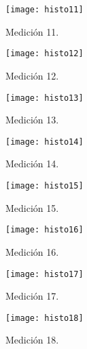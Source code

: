 \documentclass[12pt]{article}
\begin{document}
\begin{figure}[H]
\hfill
\begin{minipage}[t]{.45\textwidth}
  \centering
        \texttt{[image: histo11]}
		\caption{\footnotesize Medición 11.}
\label{fig:histo11}
\end{minipage}
\hfill
\begin{minipage}[t]{.45\textwidth}
  \centering
        \texttt{[image: histo12]}
		\caption{\footnotesize Medición 12.}
\label{fig:histo12}
\end{minipage}
\end{figure}

\begin{figure}[H]
\hfill
\begin{minipage}[t]{.45\textwidth}
  \centering
        \texttt{[image: histo13]}
		\caption{\footnotesize Medición 13.}
\label{fig:histo13}
\end{minipage}
\hfill
\begin{minipage}[t]{.45\textwidth}
  \centering
        \texttt{[image: histo14]}
		\caption{\footnotesize Medición 14.}
\label{fig:histo14}
\end{minipage}
\end{figure}

\begin{figure}[H]
\hfill
\begin{minipage}[t]{.45\textwidth}
  \centering
        \texttt{[image: histo15]}
		\caption{\footnotesize Medición 15.}
\label{fig:histo15}
\end{minipage}
\hfill
\begin{minipage}[t]{.45\textwidth}
  \centering
        \texttt{[image: histo16]}
		\caption{\footnotesize Medición 16.}
\label{fig:histo16}
\end{minipage}
\end{figure}

\begin{figure}[H]
\hfill
\begin{minipage}[t]{.45\textwidth}
  \centering
        \texttt{[image: histo17]}
		\caption{\footnotesize Medición 17.}
\label{fig:histo17}
\end{minipage}
\hfill
\begin{minipage}[t]{.45\textwidth}
  \centering
        \texttt{[image: histo18]}
		\caption{\footnotesize Medición 18.}
\label{fig:histo18}
\end{minipage}
\end{figure}
\end{document}
